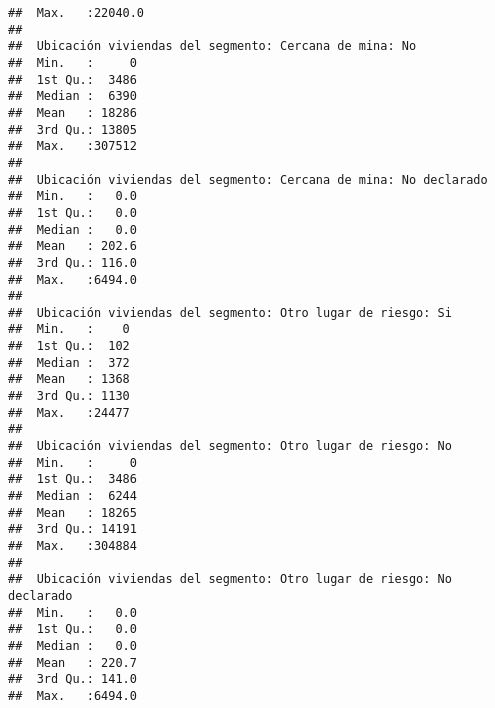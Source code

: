 \documentclass[11pt,]{article}
\begin{document}
\begin{verbatim}
##  Max.   :22040.0                                      
##                                                       
##  Ubicación viviendas del segmento: Cercana de mina: No
##  Min.   :     0                                       
##  1st Qu.:  3486                                       
##  Median :  6390                                       
##  Mean   : 18286                                       
##  3rd Qu.: 13805                                       
##  Max.   :307512                                       
##                                                       
##  Ubicación viviendas del segmento: Cercana de mina: No declarado
##  Min.   :   0.0                                                 
##  1st Qu.:   0.0                                                 
##  Median :   0.0                                                 
##  Mean   : 202.6                                                 
##  3rd Qu.: 116.0                                                 
##  Max.   :6494.0                                                 
##                                                                 
##  Ubicación viviendas del segmento: Otro lugar de riesgo: Si
##  Min.   :    0                                             
##  1st Qu.:  102                                             
##  Median :  372                                             
##  Mean   : 1368                                             
##  3rd Qu.: 1130                                             
##  Max.   :24477                                             
##                                                            
##  Ubicación viviendas del segmento: Otro lugar de riesgo: No
##  Min.   :     0                                            
##  1st Qu.:  3486                                            
##  Median :  6244                                            
##  Mean   : 18265                                            
##  3rd Qu.: 14191                                            
##  Max.   :304884                                            
##                                                            
##  Ubicación viviendas del segmento: Otro lugar de riesgo: No declarado
##  Min.   :   0.0                                                      
##  1st Qu.:   0.0                                                      
##  Median :   0.0                                                      
##  Mean   : 220.7                                                      
##  3rd Qu.: 141.0                                                      
##  Max.   :6494.0                                                      

\end{verbatim}
\end{document}
